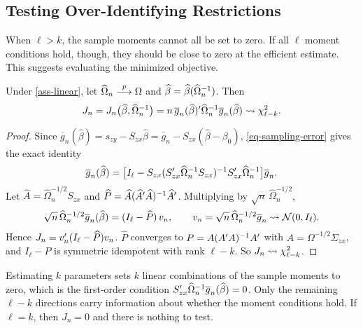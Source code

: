 \documentclass[a4paper,12pt]{article}
\begin{document}
\subsection{Testing Over-Identifying Restrictions}\label{sec-j-test}

When $\ell>k$, the sample moments cannot all be set to zero.
If all $\ell$ moment conditions hold, though, they should be close to zero at the efficient estimate.
This suggests evaluating the minimized objective.

\begin{theorem}\label{thm-j-test}
	Under \autoref{ass-linear}, let $\widehat\Omega_n\overset{p}{\longrightarrow}\Omega$ and $\widehat\beta=\widehat\beta(\widehat\Omega_n^{-1})$. Then
	\begin{align}
		J_n=J_n\bigl(\widehat\beta,\widehat\Omega_n^{-1}\bigr)=n\,\overline g_n(\widehat\beta)^{\prime}\widehat\Omega_n^{-1}\overline g_n(\widehat\beta)\overset{}{\leadsto}\chi^2_{\ell-k}.
	\end{align}
\end{theorem}
\begin{proof}
	Since $\overline g_n(\widehat\beta)=s_{zy}-S_{zx}\widehat\beta=\overline g_n-S_{zx}(\widehat\beta-\beta_0)$, \eqref{eq-sampling-error} gives the exact identity
	\begin{align*}
		\overline g_n(\widehat\beta)=\bigl[I_\ell-S_{zx}(S_{zx}^{\prime}\widehat\Omega_n^{-1} S_{zx})^{-1} S_{zx}^{\prime}\widehat\Omega_n^{-1}\bigr]\overline g_n.
	\end{align*}
	Let $\widehat A=\widehat\Omega_n^{-1/2}S_{zx}$ and $\widehat P=\widehat A(\widehat A^{\prime}\widehat A)^{-1}\widehat A^{\prime}$.
	Multiplying by $\sqrt n\,\widehat\Omega_n^{-1/2}$,
	\begin{align*}
		\sqrt n\,\widehat\Omega_n^{-1/2}\overline g_n(\widehat\beta)=(I_\ell-\widehat P)\,v_n,
		\qquad
		v_n=\sqrt n\,\widehat\Omega_n^{-1/2}\overline g_n\overset{}{\leadsto}\operatorname{\mathcal{N}}(0,I_\ell).
	\end{align*}
	Hence $J_n=v_n^{\prime}(I_\ell-\widehat P)v_n$.
	$\widehat P$ converges to $P=A(A^{\prime} A)^{-1} A^{\prime}$ with $A=\Omega^{-1/2}\Sigma_{zx}$,
	and $I_\ell-P$ is symmetric idempotent with rank $\ell-k$.
	So $J_n\overset{}{\leadsto}\chi^2_{\ell-k}$.
\end{proof}

\begin{remark}
	Estimating $k$ parameters sets $k$ linear combinations of the sample moments to zero,
	which is the first-order condition $S_{zx}^{\prime}\widehat\Omega_n^{-1}\overline g_n(\widehat\beta)=0$.
	Only the remaining $\ell-k$ directions carry information about whether the moment conditions hold.
	If $\ell=k$, then $J_n=0$ and there is nothing to test.
\end{remark}
\end{document}
